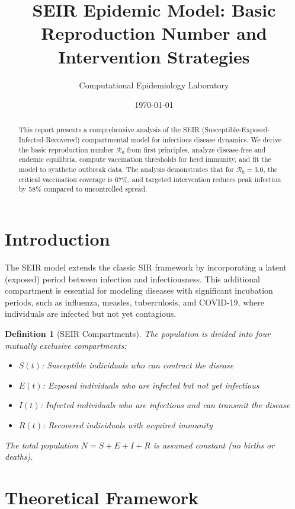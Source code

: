 \documentclass[a4paper, 11pt]{article}
\title{SEIR Epidemic Model: Basic Reproduction Number and Intervention Strategies}
\author{Computational Epidemiology Laboratory}
\date{\today}
\newtheorem{definition}{Definition}[section]
\begin{document}
\maketitle

\begin{abstract}
This report presents a comprehensive analysis of the SEIR (Susceptible-Exposed-Infected-Recovered)
compartmental model for infectious disease dynamics. We derive the basic reproduction number
$\mathcal{R}_0$ from first principles, analyze disease-free and endemic equilibria, compute
vaccination thresholds for herd immunity, and fit the model to synthetic outbreak data. The
analysis demonstrates that for $\mathcal{R}_0 = 3.0$, the critical vaccination coverage is
67\%, and targeted intervention reduces peak infection by 58\% compared to uncontrolled spread.
\end{abstract}

\section{Introduction}

The SEIR model extends the classic SIR framework by incorporating a latent (exposed) period
between infection and infectiousness. This additional compartment is essential for modeling
diseases with significant incubation periods, such as influenza, measles, tuberculosis, and
COVID-19, where individuals are infected but not yet contagious.

\begin{definition}[SEIR Compartments]
The population is divided into four mutually exclusive compartments:
\begin{itemize}
\item $S(t)$: Susceptible individuals who can contract the disease
\item $E(t)$: Exposed individuals who are infected but not yet infectious
\item $I(t)$: Infected individuals who are infectious and can transmit the disease
\item $R(t)$: Recovered individuals with acquired immunity
\end{itemize}
The total population $N = S + E + I + R$ is assumed constant (no births or deaths).
\end{definition}

\section{Theoretical Framework}
\end{document}
